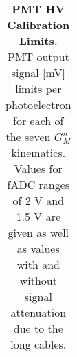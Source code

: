 \documentclass[10pt]{article}
\begin{document}
\begin{table}[h]
\begin{tabular}{|c|cccccc|}
	\hline
	\end{tabular}
	\caption{{\bf{PMT HV Calibration Limits.}} PMT output signal [mV] limits per photoelectron for each of the seven $G_M^n$ kinematics. Values for fADC ranges of 2 V and 1.5 V are given as well as values with and without signal attenuation due to the long cables.} %
	\label{tab:max_outputs}
	\end{table}
	
	
\end{document}
